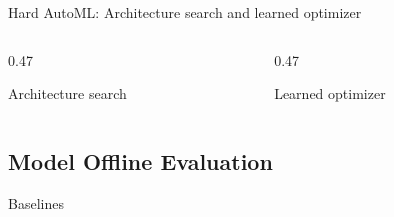 \begin{frame}{Hard AutoML: Architecture search and learned optimizer}
  \begin{columns}[T,onlytextwidth]
    \begin{column}{0.47\textwidth}
      \begin{tdblockt}[equal height group=hard]{Architecture search}
      \end{tdblockt}
    \end{column}
    \begin{column}{0.47\textwidth}
      \begin{tdblockt}[equal height group=hard]{Learned optimizer}
      \end{tdblockt}
    \end{column}
  \end{columns}
\end{frame}

\subsection{Model Offline Evaluation}

\begin{frame}{Baselines}
  \begin{withmargin}
    \begin{tdmain}
    \end{tdmain}
    \begin{tdmargin}
    \end{tdmargin}
  \end{withmargin}
  \begin{takeaway}
  \end{takeaway}
\end{frame}

